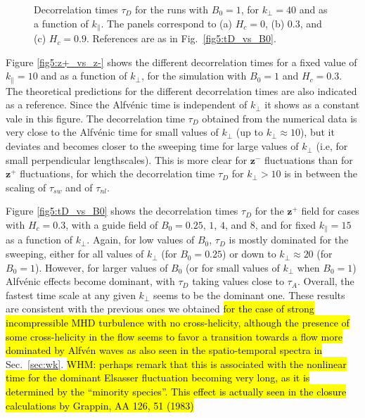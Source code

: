 \documentclass[aip,pop,reprint,amsmath,amssymb,floatfix]{revtex4-1}
\def\WHM#1{{\hl{WHM: #1}}}
\renewcommand{\vec}[1]{\mathbf{#1}}
\begin{document}
\begin{figure}
  \centering
    \caption{Decorrelation times $\tau_D$ for the runs with $B_0=1$, for $k_\perp=40$ and as a function of $k_\parallel$. The panels correspond to (a) $H_c = 0$, (b) $0.3$, and (c) $H_c = 0.9$. References are as in Fig.~\ref{fig5:tD_vs_B0}.}
  \label{fig5:tD_vs_Hc}
\end{figure}

Figure \ref{fig5:z+_vs_z-} shows the different decorrelation times for a fixed value of $k_{\parallel}=10$ and as a function of $k_{\perp}$, for the simulation with $B_0=1$ and $H_c=0.3$. The theoretical predictions for the different decorrelation times are also indicated as a reference. Since the Alfv\'enic time is independent of $k_{\perp}$ it shows as a constant vale in this figure. The decorrelation
time $\tau_D$ obtained from the numerical data is very close to the Alfv\'enic time for small values of $k_{\perp}$ (up to $k_\perp \approx 10$), but it deviates and becomes closer to the sweeping time for large values of $k_{\perp}$ (i.e, for small perpendicular lengthscales). This is more clear for $\vec{z}^-$ fluctuations than for $\vec{z}^+$ fluctuations, for which the decorrelation time $\tau_D$ for $k_\perp > 10$ is in between the scaling of $\tau_{sw}$ and of $\tau_{nl}$.

Figure \ref{fig5:tD_vs_B0} shows the decorrelation times $\tau_D$ for the $\vec{z}^+$ field for cases with $H_c = 0.3$, with a guide field of $B_0=0.25$, $1$, $4$, and $8$, and for fixed $k_\parallel = 15$ as a function of $k_\perp$. Again, for low values of $B_0$, $\tau_D$ is mostly dominated for the sweeping, either for all values of $k_\perp$ (for $B_0=0.25$) or down to $k_\perp \approx 20$ (for $B_0=1$). However, for larger values of $B_0$ (or for small values of $k_\perp$ when $B_0=1$) Alfv\'enic effects become dominant, with $\tau_D$ taking values close to $\tau_{A}$. Overall, the fastest time scale at any given $k_\perp$ seems to be the dominant one. These results are consistent with
the previous ones we obtained \cite{lugones_2016_spatiotemporal} \hl{for the case of strong incompressible MHD turbulence with no cross-helicity, although the presence of some cross-helicity in the flow seems to favor a transition towards a flow more dominated by Alfv\'en waves as also seen in the spatio-temporal spectra in} Sec.~\ref{sec:wk}. \WHM{perhaps remark that this is associated with the nonlinear time for the dominant Elsasser fluctuation becoming  very long, as it is determined by the ``minority species''. This effect is actually seen in the closure calculations by Grappin, AA 126, 51 (1983) }
\end{document}
